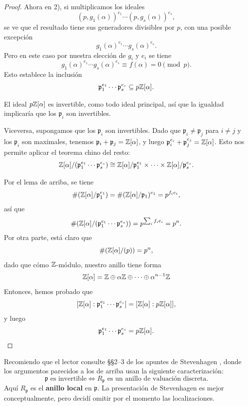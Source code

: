 \begin{teorema}
\begin{proof}
    Ahora en 2), si multiplicamos los ideales
    $$(p, g_1 (\alpha))^{e_1}\cdots (p, g_s (\alpha))^{e_s},$$
    se ve que el resultado tiene sus generadores divisibles por $p$, con una
    posible excepción
    $$g_1 (\alpha)^{e_1}\cdots g_s (\alpha)^{e_s}.$$
    Pero en este caso por nuestra elección de $g_i$ y $e_i$ se tiene
    $$g_1 (\alpha)^{e_1}\cdots g_s (\alpha)^{e_s} \equiv f (\alpha) = 0 \pmod{p}.$$
    Esto establece la inclusión
    \[ \mathfrak{p}_1^{e_1} \cdots \mathfrak{p}_s^{e_s} \subseteq p \mathbb{Z} [\alpha]. \]

    El ideal $p \mathbb{Z}[\alpha]$ es invertible, como todo ideal principal, así que
    la igualdad implicaría que los $\mathfrak{p}_i$ son invertibles.

    Viceversa, supongamos que los $\mathfrak{p}_i$ son invertibles. Dado que
    $\mathfrak{p}_i \ne \mathfrak{p}_j$ para $i\ne j$ y los $\mathfrak{p}_i$ son
    maximales, tenemos $\mathfrak{p}_i + \mathfrak{p}_j = \mathbb{Z} [\alpha]$,
    y luego $\mathfrak{p}_i^{e_i} + \mathfrak{p}_j^{e_j} = \mathbb{Z} [\alpha]$.
    Esto nos permite aplicar el teorema chino del resto:
    \[ \mathbb{Z}[\alpha]/(\mathfrak{p}_1^{e_1} \cdots \mathfrak{p}_s^{e_s}) \cong
         \mathbb{Z}[\alpha]/\mathfrak{p}_1^{e_1} \times \cdots \times
           \mathbb{Z}[\alpha]/\mathfrak{p}_s^{e_s}. \]

    Por el lema de arriba, se tiene
    \[ \# (\mathbb{Z}[\alpha]/\mathfrak{p}_1^{e_1}) =
       \#(\mathbb{Z}[\alpha]/\mathfrak{p}_1)^{e_1} = p^{f_i e_i}, \]
    así que
    \[ \# (\mathbb{Z} [\alpha] / (\mathfrak{p}_1^{e_1} \cdots \mathfrak{p}_s^{e_s})) =
       p^{\sum_i f_i e_i} = p^n. \]
    Por otra parte, está claro que
    $$\# (\mathbb{Z} [\alpha] / (p)) = p^n,$$
    dado que cómo $\mathbb{Z}$-módulo, nuestro anillo tiene forma
    $$\mathbb{Z} [\alpha] = \mathbb{Z} \oplus \alpha \mathbb{Z} \oplus \cdots \oplus \alpha^{n-1} \mathbb{Z}$$
    Entonces, hemos probado que
    \[ [\mathbb{Z} [\alpha] : \mathfrak{p}_1^{e_1} \cdots \mathfrak{p}_s^{e_s}] =
       [\mathbb{Z} [\alpha] : p \mathbb{Z} [\alpha]], \]
    y luego
    \[ \mathfrak{p}_1^{e_1} \cdots \mathfrak{p}_s^{e_s} = p \mathbb{Z} [\alpha]. \qedhere \]
  \end{proof}
\end{teorema}

\begin{comentario}
  Recomiendo que el lector consulte \S\S 2--3 de los apuntes de Stevenhagen
  \cite{Stevenhagen-NR}, donde los argumentos parecidos a los de arriba usan
  la siguiente caracterización:
  \[ \mathfrak{p}\text{ es invertible} \iff
     R_\mathfrak{p}\text{ es un anillo de valuación discreta}. \]
  Aquí $R_\mathfrak{p}$ es el \textbf{anillo local} en $\mathfrak{p}$.
  La presentación de Stevenhagen es mejor conceptualmente, pero decidí omitir
  por el momento las localizaciones.
\end{comentario}


